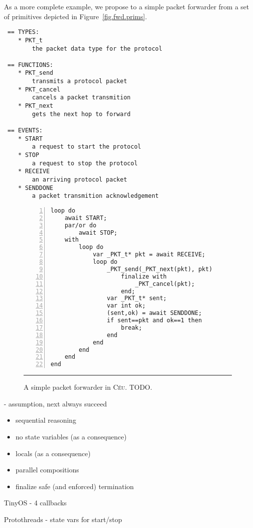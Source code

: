 \documentclass{llncs}
\newcommand{\CEU}{\textsc{C\'{e}u}\xspace}
\begin{document}
As a more complete example, we propose to a simple packet forwarder from a set 
of primitives depicted in Figure~\ref{fig.fwd.prims}.

\begin{lstlisting}
 == TYPES:
    * PKT_t
        the packet data type for the protocol

 == FUNCTIONS:
    * PKT_send
        transmits a protocol packet
    * PKT_cancel
        cancels a packet transmition
    * PKT_next
        gets the next hop to forward

 == EVENTS:
    * START
        a request to start the protocol
    * STOP
        a request to stop the protocol
    * RECEIVE
        an arriving protocol packet
    * SENDDONE
        a packet transmition acknowledgement
\end{lstlisting}

\begin{figure}[h]
\begin{lstlisting}[numbers=left,xleftmargin=2em]
loop do
    await START;
    par/or do
        await STOP;
    with
        loop do
            var _PKT_t* pkt = await RECEIVE;
            loop do
                _PKT_send(_PKT_next(pkt), pkt)
                    finalize with
                        _PKT_cancel(pkt);
                    end;
                var _PKT_t* sent;
                var int ok;
                (sent,ok) = await SENDDONE;
                if sent==pkt and ok==1 then
                    break;
                end
            end
        end
    end
end
\end{lstlisting}
\rule{12.2cm}{0.37pt}
\caption{ A simple packet forwarder in \CEU.\newline
{\small %
TODO.
}%
\label{lst.TODO}
}
\end{figure}

- assumption, next always succeed

\begin{itemize}
\item sequential reasoning
\item no state variables (as a consequence)
\item locals (as a consequence)
\item parallel compositions
\item finalize safe (and enforced) termination
\end{itemize}

TinyOS
- 4 callbacks

Protothreads
- state vars for start/stop
\end{document}
